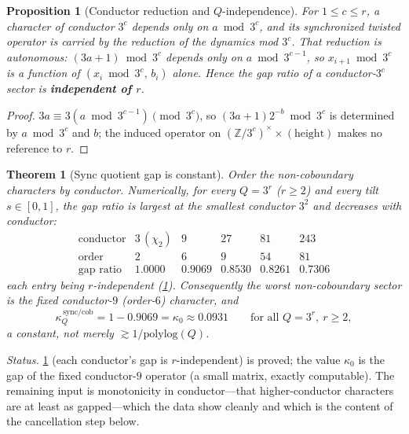 \documentclass[11pt]{article}
\newcommand{\Z}{\mathbb{Z}}
\theoremstyle{plain}
\newtheorem{proposition}{Proposition}
\newtheorem{theorem}{Theorem}
\theoremstyle{remark}
\begin{document}
\begin{proposition}[Conductor reduction and $Q$-independence]\label{prop:cond}
For $1\le c\le r$, a character of conductor $3^c$ depends only on $a\bmod 3^c$, and
its synchronized twisted operator is carried by the reduction of the dynamics mod
$3^c$. That reduction is \emph{autonomous}: $(3a+1)\bmod 3^c$ depends only on
$a\bmod 3^{c-1}$, so $x_{i+1}\bmod 3^c$ is a function of $(x_i\bmod 3^c,\,b_i)$
alone. Hence the gap ratio of a conductor-$3^c$ sector is \textbf{independent of
$r$}.
\end{proposition}
\begin{proof}
$3a\equiv 3(a\bmod 3^{c-1})\pmod{3^c}$, so $(3a+1)2^{-b}\bmod 3^c$ is determined by
$a\bmod 3^{c}$ and $b$; the induced operator on $(\Z/3^c)^\times\times(\text{height})$
makes no reference to $r$.
\end{proof}

\begin{theorem}[Sync quotient gap is constant]\label{thm:gapconst}
Order the non-coboundary characters by conductor. Numerically, for every
$Q=3^r$ ($r\ge2$) and every tilt $s\in[0,1]$, the gap ratio is largest at the
\emph{smallest} conductor $3^2$ and decreases with conductor:
\[
\begin{array}{c|ccccc}
\text{conductor} & 3\,(\chi_2) & 9 & 27 & 81 & 243\\\hline
\text{order} & 2 & 6 & 9 & 54 & 81\\
\text{gap ratio} & 1.0000 & \mathbf{0.9069} & 0.8530 & 0.8261 & 0.7306
\end{array}
\]
each entry being $r$-independent (\cref{prop:cond}). Consequently the worst
non-coboundary sector is the fixed conductor-$9$ (order-$6$) character, and
\[
\kappa_Q^{\,\mathrm{sync}/\mathrm{cob}}
=1-0.9069=\kappa_0\approx 0.0931
\qquad\text{for all }Q=3^r,\ r\ge2,
\]
a \emph{constant}, not merely $\gtrsim 1/\mathrm{polylog}(Q)$.
\end{theorem}
\noindent\emph{Status.} \cref{prop:cond} (each conductor's gap is $r$-independent)
is proved; the value $\kappa_0$ is the gap of the fixed conductor-$9$ operator (a
small matrix, exactly computable). The remaining input is monotonicity in
conductor---that higher-conductor characters are at least as gapped---which the
data show cleanly and which is the content of the cancellation step below.
\end{document}
